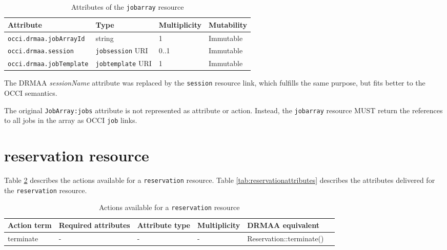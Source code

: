 \documentclass[10pt]{article}
\newcommand{\h}[1]{\lstinline|#1|}
\begin{document}
\begin{table}[ht]
\centering
\begin{tabularx}{\textwidth}{|l|X|X|X|}
\hline
Attribute   & Type                & Multiplicity & Mutability \\
\hline
\h{occi.drmaa.jobArrayId}  & string              & 1            & Immutable \\ %
\h{occi.drmaa.session}     & \h{jobsession} URI  & 0..1         & Immutable \\ %
\h{occi.drmaa.jobTemplate} & \h{jobtemplate} URI & 1            & Immutable \\ %
\hline
\end{tabularx}
\caption{Attributes of the \h{jobarray} resource}
\label{tab:jobattributes}
\end{table}

The DRMAA \emph{sessionName} attribute was replaced by the \h{session} resource link, which fulfills the same purpose, but fits better to the OCCI semantics.

The original \h{JobArray:jobs} attribute is not represented as attribute or action. Instead, the \h{jobarray} resource MUST return the references to all jobs in the array as OCCI \h{job} links. 


\section{reservation resource}

Table \ref{tab:reservationactions} describes the actions available for a \h{reservation} resource. Table \ref{tab:reservationattributes} describes the attributes delivered for the \h{reservation} resource.

\begin{table}[ht]
\centering
\begin{tabularx}{\textwidth}{|l|l|l|l|X|l|}
\hline
Action term & Required attributes & Attribute type    & Multiplicity & DRMAA equivalent        \\
\hline
terminate   & -                   & -                 & -            & Reservation::terminate() \\
\hline
\end{tabularx}
\caption{Actions available for a \h{reservation} resource}
\label{tab:reservationactions}
\end{table}
\end{document}
